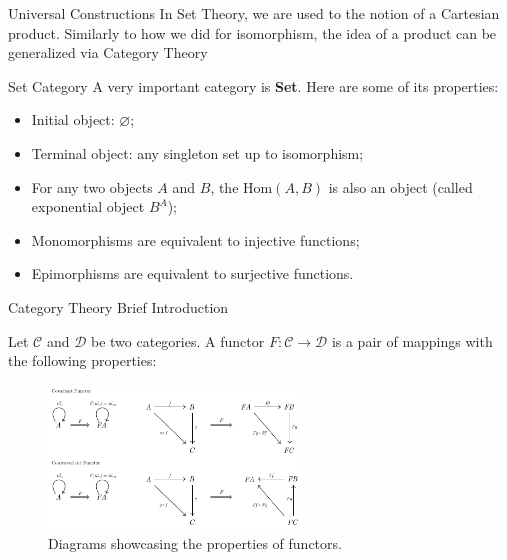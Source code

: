 \documentclass[aspectratio=169,xcolor=dvipsnames,10pt]{beamer}
\theoremstyle{definition}
\begin{document}
\begin{frame}[fragile]{Universal Constructions}
    In Set Theory, we are used to the notion of a Cartesian product.
    Similarly to how we did for isomorphism, the idea of a product can be generalized via Category Theory
	\begin{definition}[Product]
	\end{definition}
\end{frame}

\begin{frame}[fragile]{Set Category}
    A very important category is \textbf{Set}. Here are some of its properties:
    \begin{itemize}
        \item Initial object: $\varnothing$;
        \item Terminal object: any singleton set up to isomorphism;
        \item For any two objects $A$ and $B$, the $\text{Hom}(A,B)$ is also an object (called exponential object $B^A$);
        \item Monomorphisms are equivalent to injective functions;
        \item Epimorphisms are equivalent to surjective functions.
    \end{itemize}
\end{frame}

\begin{frame}[fragile]{Category Theory Brief Introduction}
	\begin{definition}[Functor]
		Let $\mathcal C$ and $\mathcal D$ be two categories. A functor $F: \mathcal C \to \mathcal D$ is
		a pair of mappings with the following properties:
		\begin{figure}[H]
			\begin{center}
				\includegraphics[width=0.6\textwidth]{./figs/Functor.pdf}
			\end{center}
			\caption{Diagrams showcasing the properties of functors.}
			\label{fig:Functor}
		\end{figure}
	\end{definition}

\end{frame}
\end{document}

